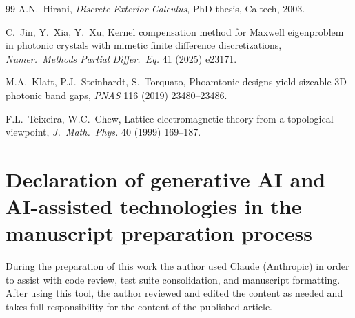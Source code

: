 \documentclass[preprint,12pt]{elsarticle}
\begin{document}
\begin{thebibliography}{99}
A.N.~Hirani,
\emph{Discrete Exterior Calculus},
PhD thesis, Caltech, 2003.

C.~Jin, Y.~Xia, Y.~Xu,
Kernel compensation method for Maxwell eigenproblem in photonic crystals with mimetic finite difference discretizations,
\emph{Numer.\ Methods Partial Differ.\ Eq.} 41 (2025) e23171.

M.A.~Klatt, P.J.~Steinhardt, S.~Torquato,
Phoamtonic designs yield sizeable 3D photonic band gaps,
\emph{PNAS} 116 (2019) 23480--23486.

F.L.~Teixeira, W.C.~Chew,
Lattice electromagnetic theory from a topological viewpoint,
\emph{J.\ Math.\ Phys.} 40 (1999) 169--187.

\end{thebibliography}

\section*{Declaration of generative AI and AI-assisted technologies in the manuscript preparation process}

During the preparation of this work the author used Claude (Anthropic) in order to assist with code review, test suite consolidation, and manuscript formatting. After using this tool, the author reviewed and edited the content as needed and takes full responsibility for the content of the published article.
\end{document}

